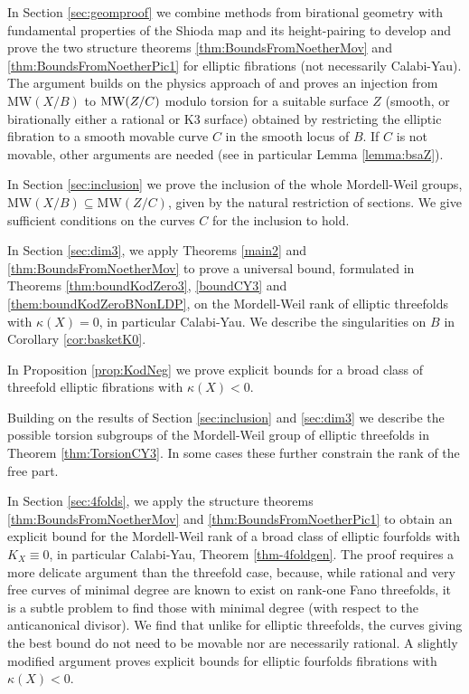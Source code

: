 \documentclass[11pt]{amsart}
\theoremstyle{definition}
\theoremstyle{definition}
\theoremstyle{remark}
\theoremstyle{remark}
\theoremstyle{definition}
\theoremstyle{conjecture}
\newcommand{\MW}{\mathrm{MW}}
\begin{document}
 In Section \ref{sec:geomproof} we combine methods from birational geometry with fundamental properties of the Shioda map and its height-pairing to  develop and prove the two structure theorems \ref{thm:BoundsFromNoetherMov} and \ref{thm:BoundsFromNoetherPic1} for elliptic fibrations (not necessarily Calabi-Yau).  
 The argument builds on  
 the physics approach of \cite{Lee:2018ihr, Lee:2019skh, Martucci:2022krl, Lee:2022swr} and proves an injection from $\MW(X/B)$ to ${\rm MW}(Z/C)$ modulo torsion  for a suitable surface $Z$ (smooth, or  birationally  either a rational or  K3 surface) obtained by restricting the elliptic fibration to a smooth  movable curve $C$ in the smooth locus of  $B$. 
 If $C$ is not movable, other arguments are needed (see in particular Lemma \ref{lemma:bsaZ}).
 

In Section \ref{sec:inclusion} we prove  the inclusion of the whole Mordell-Weil groups, $\MW(X/B) \subseteq \MW (Z/C)$, given by the natural restriction of sections.
 We  give sufficient conditions on  the curves $C$ for the inclusion to hold.
 
 In Section \ref{sec:dim3}, we apply  Theorems \ref{main2} and  \ref{thm:BoundsFromNoetherMov} to prove a universal bound, formulated in Theorems \ref{thm:boundKodZero3},  \ref{boundCY3} and \ref{them:boundKodZeroBNonLDP}, on the Mordell-Weil rank of  elliptic 
 threefolds with  $\kappa(X) = 0$, in particular Calabi-Yau. We describe the singularities on $B$ in Corollary \ref{cor:basketK0}.
   
   In  Proposition \ref{prop:KodNeg} we prove explicit bounds for a broad class of  threefold elliptic fibrations with $\kappa(X) < 0$. 
  \color{black}
 
  
Building on the results of Section  \ref{sec:inclusion} and \ref{sec:dim3} we describe the possible torsion subgroups of the Mordell-Weil group of elliptic threefolds in Theorem \ref{thm:TorsionCY3}. In some cases these further constrain 
the rank of the free part. 

\color{black}
In Section \ref{sec:4folds}, we apply the structure theorems  \ref{thm:BoundsFromNoetherMov} and \ref{thm:BoundsFromNoetherPic1} to obtain an explicit bound for the Mordell-Weil rank of a broad class of elliptic  fourfolds with $K_X \equiv 0$, in particular Calabi-Yau, Theorem \ref{thm-4foldgen}.   The proof requires a more delicate argument than the threefold case, because, while rational and very free curves of  minimal degree are known to exist on rank-one Fano threefolds, it is a subtle problem to find those with minimal degree (with respect to the anticanonical divisor). We find that unlike for elliptic threefolds,  the curves giving the best bound  do not need to be  movable nor are necessarily rational. A slightly modified argument proves explicit bounds for elliptic   fourfolds fibrations with $\kappa(X) < 0$.
\end{document}
